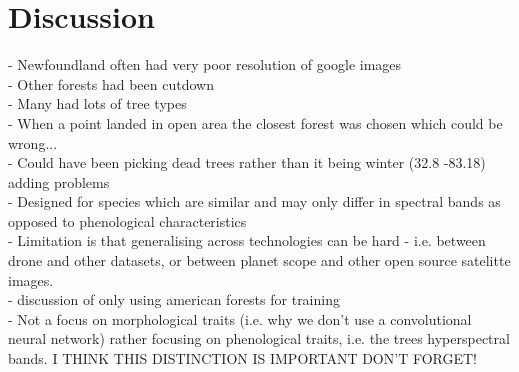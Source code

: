 \documentclass[9pt,lineno]{elife}
\begin{document}
\section{Discussion}

- Newfoundland often had very poor resolution of google images\\
- Other forests had been cutdown\\
- Many had lots of tree types\\
- When a point landed in open area the closest forest was chosen which could be wrong...\\
- Could have been picking dead trees rather than it being winter (32.8	-83.18) adding problems\\
- Designed for species which are similar and may only differ in spectral bands as opposed to phenological characteristics \\
- Limitation is that generalising across technologies can be hard - i.e. between drone and other datasets, or between planet scope and other open source satelitte images.\\
- discussion of only using american forests for training\\
- Not a focus on morphological traits (i.e. why we don't use a convolutional neural network) rather focusing on phenological traits, i.e. the trees hyperspectral bands. I THINK THIS DISTINCTION IS IMPORTANT DON'T FORGET!



\end{document}
